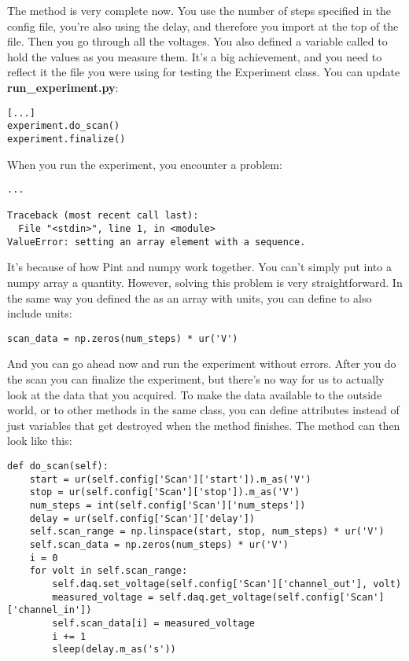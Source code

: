 The  method is very complete now. You use the number of steps specified in the config file, you're also using the delay, and therefore you import  at the top of the file. Then you go through all the voltages. You also defined a variable called  to hold the values as you measure them. It's a big achievement, and you need to reflect it the file you were using for testing the Experiment class. You can update \textbf{run\_experiment.py}:

\begin{verbatim}
[...]
experiment.do_scan()
experiment.finalize()
\end{verbatim}

When you run the experiment, you encounter a problem:

\begin{verbatim}
...

Traceback (most recent call last):
  File "<stdin>", line 1, in <module>
ValueError: setting an array element with a sequence.
\end{verbatim}

It's because of how Pint and numpy work together. You can't simply put into a numpy array a quantity. However, solving this problem is very straightforward. In the same way you defined the  as an array with units, you can define  to also include units:

\begin{verbatim}
scan_data = np.zeros(num_steps) * ur('V')
\end{verbatim}

And you can go ahead now and run the experiment without errors. After you do the scan you can finalize the experiment, but there's no way for us to actually look at the data that you acquired. To make the data available to the outside world, or to other methods in the same class, you can define attributes instead of just variables that get destroyed when the method finishes. The  method can then look like this:

\begin{verbatim}
def do_scan(self):
    start = ur(self.config['Scan']['start']).m_as('V')
    stop = ur(self.config['Scan']['stop']).m_as('V')
    num_steps = int(self.config['Scan']['num_steps'])
    delay = ur(self.config['Scan']['delay'])
    self.scan_range = np.linspace(start, stop, num_steps) * ur('V')
    self.scan_data = np.zeros(num_steps) * ur('V')
    i = 0
    for volt in self.scan_range:
        self.daq.set_voltage(self.config['Scan']['channel_out'], volt)
        measured_voltage = self.daq.get_voltage(self.config['Scan']['channel_in'])
        self.scan_data[i] = measured_voltage
        i += 1
        sleep(delay.m_as('s'))
\end{verbatim}

